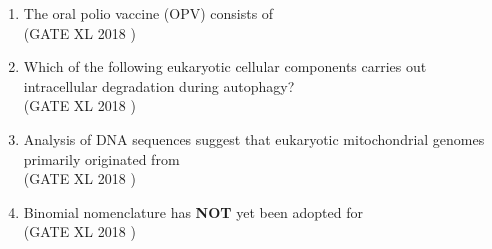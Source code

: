 \documentclass[14pt]{extarticle}
\begin{document}
\begin{flushleft}
\begin{enumerate}
\item The oral polio vaccine (OPV) consists of\\
\hfill(GATE XL 2018 )\\
\begin{enumerate}
\end{enumerate}

\item Which of the following eukaryotic cellular components carries out intracellular degradation during autophagy?\\
\hfill(GATE XL 2018 )\\
\begin{enumerate}
\end{enumerate}

\item Analysis of DNA sequences suggest that eukaryotic mitochondrial genomes primarily originated from\\
\hfill(GATE XL 2018 )\\
\begin{enumerate}
\end{enumerate}

\item Binomial nomenclature has \textbf{NOT} yet been adopted for\\
\hfill(GATE XL 2018 )\\
\begin{enumerate}
\end{enumerate}


\end{enumerate}
\end{flushleft}
\end{document}
